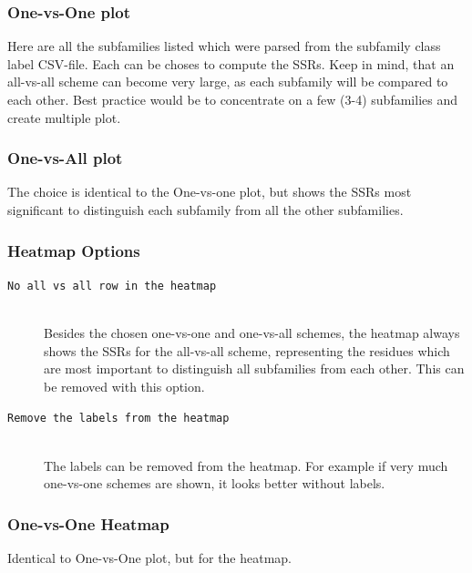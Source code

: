 \documentclass[a4paper,10pt]{article}
\begin{document}
\subsubsection{One-vs-One plot}

Here are all the subfamilies listed which were parsed from the subfamily class label CSV-file. 
Each can be choses to compute the SSRs. Keep in mind, that an all-vs-all scheme can become very large, as each
subfamily will be compared to each other. Best practice would be to concentrate on a few (3-4) subfamilies and create multiple plot.

\subsubsection{One-vs-All plot}

The choice is identical to the One-vs-one plot, but shows the SSRs most significant to distinguish each subfamily from all the other 
subfamilies.

\subsubsection{Heatmap Options}

\begin{description}

\item[\texttt{No all vs all row in the heatmap}] \hfill \\

Besides the chosen one-vs-one and one-vs-all schemes, the heatmap always shows the SSRs for the all-vs-all scheme, representing the residues
which are most important to distinguish all subfamilies from each other. This can be removed with this option.

\item[\texttt{Remove the labels from the heatmap}] \hfill \\

The labels can be removed from the heatmap. For example if very much one-vs-one schemes are shown, it looks better without labels.

\end{description}

\subsubsection{One-vs-One Heatmap}

Identical to One-vs-One plot, but for the heatmap.
\end{document}
